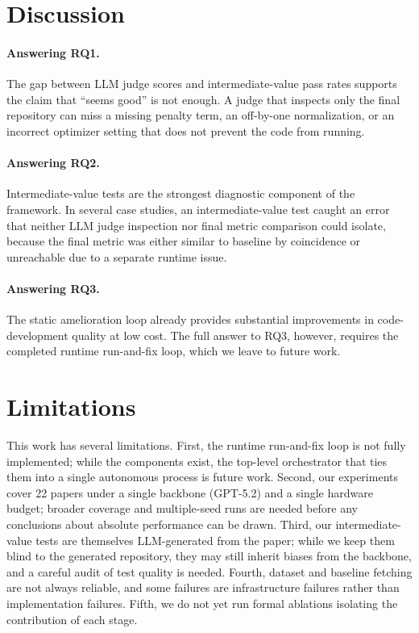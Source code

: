 \documentclass[11pt]{article}
\begin{document}
\section{Discussion}

\paragraph{Answering RQ1.} The gap between LLM judge scores and
intermediate-value pass rates supports the claim that
``seems good'' is not enough. A judge that inspects only the
final repository can miss a missing penalty term, an off-by-one
normalization, or an incorrect optimizer setting that does not
prevent the code from running.

\paragraph{Answering RQ2.} Intermediate-value tests are the
strongest diagnostic component of the framework. In several
case studies, an intermediate-value test caught an error that
neither LLM judge inspection nor final metric comparison could
isolate, because the final metric was either similar to baseline
by coincidence or unreachable due to a separate runtime issue.

\paragraph{Answering RQ3.} The static amelioration loop already
provides substantial improvements in code-development quality at
low cost. The full answer to RQ3, however, requires the
completed runtime run-and-fix loop, which we leave to future
work.



\section*{Limitations}

This work has several limitations. First, the runtime run-and-fix
loop is not fully implemented; while the components exist, the
top-level orchestrator that ties them into a single autonomous
process is future work. Second, our experiments cover 22 papers
under a single backbone (GPT-5.2) and a single hardware budget;
broader coverage and multiple-seed runs are needed before any
conclusions about absolute performance can be drawn. Third, our
intermediate-value tests are themselves LLM-generated from the
paper; while we keep them blind to the generated repository,
they may still inherit biases from the backbone, and a careful
audit of test quality is needed. Fourth, dataset and baseline
fetching are not always reliable, and some failures are
infrastructure failures rather than implementation failures.
Fifth, we do not yet run formal ablations isolating the
contribution of each stage.
\end{document}
